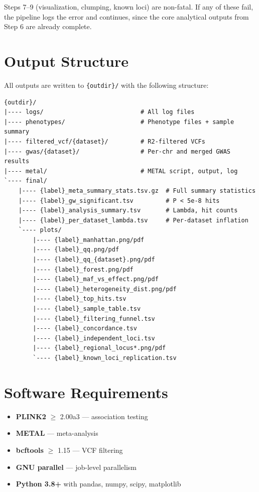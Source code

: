 \documentclass[11pt,letterpaper]{article}
\begin{document}
Steps 7--9 (visualization, clumping, known loci) are non-fatal. If any of these fail, the pipeline logs the error and continues, since the core analytical outputs from Step 6 are already complete.

\section{Output Structure}

All outputs are written to \texttt{\{outdir\}/} with the following structure:

\begin{verbatim}
{outdir}/
|---- logs/                           # All log files
|---- phenotypes/                     # Phenotype files + sample summary
|---- filtered_vcf/{dataset}/         # R2-filtered VCFs
|---- gwas/{dataset}/                 # Per-chr and merged GWAS results
|---- metal/                          # METAL script, output, log
`---- final/
    |---- {label}_meta_summary_stats.tsv.gz  # Full summary statistics
    |---- {label}_gw_significant.tsv         # P < 5e-8 hits
    |---- {label}_analysis_summary.tsv       # Lambda, hit counts
    |---- {label}_per_dataset_lambda.tsv     # Per-dataset inflation
    `---- plots/
        |---- {label}_manhattan.png/pdf
        |---- {label}_qq.png/pdf
        |---- {label}_qq_{dataset}.png/pdf
        |---- {label}_forest.png/pdf
        |---- {label}_maf_vs_effect.png/pdf
        |---- {label}_heterogeneity_dist.png/pdf
        |---- {label}_top_hits.tsv
        |---- {label}_sample_table.tsv
        |---- {label}_filtering_funnel.tsv
        |---- {label}_concordance.tsv
        |---- {label}_independent_loci.tsv
        |---- {label}_regional_locus*.png/pdf
        `---- {label}_known_loci_replication.tsv
\end{verbatim}

\section{Software Requirements}

\begin{itemize}[nosep]
    \item \textbf{PLINK2} $\geq$ 2.00a3 --- association testing
    \item \textbf{METAL} --- meta-analysis
    \item \textbf{bcftools} $\geq$ 1.15 --- VCF filtering
    \item \textbf{GNU parallel} --- job-level parallelism
    \item \textbf{Python 3.8+} with pandas, numpy, scipy, matplotlib
\end{itemize}
\end{document}
